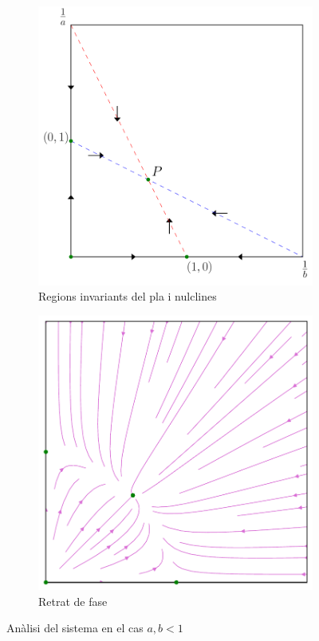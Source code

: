 \documentclass[12pt]{article}
\numberwithin{table}{section}
\numberwithin{equation}{section}
\numberwithin{figure}{section}
\begin{document}
\begin{figure}[htb]
	\centering
	\begin{subfigure}[htb]{0.48\textwidth}
		\centering
		\includegraphics[width=\textwidth]{retrat-1a.pdf}
		\caption{Regions invariants del pla i nulclines}
		\label{fig:retrat 1a}
	\end{subfigure}
	\begin{subfigure}[htb]{0.48\textwidth}
		\centering
		\includegraphics[width=\textwidth]{retrat-1b.pdf}
		\caption{Retrat de fase}
		\label{fig:retrat 1b}
	\end{subfigure}
	\caption{Anàlisi del sistema en el cas \( a,b < 1 \)}
\end{figure}
\end{document}
